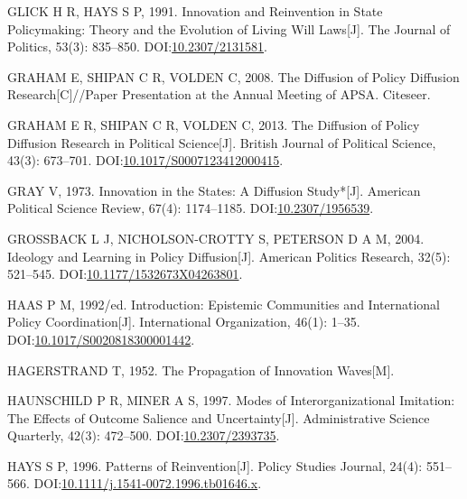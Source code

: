 \documentclass[
  12pt,
]{ctexart}
\newlength{\cslhangindent}
\newlength{\cslentryspacingunit} %
\newenvironment{CSLReferences}[2] %
 {%
  \setlength{\parindent}{0pt}
  \ifodd #1
  \let\oldpar\par
  \def\par{\hangindent=\cslhangindent\oldpar}
  \fi
  \setlength{\parskip}{#2\cslentryspacingunit}
 }%
 {}
\begin{document}
\begin{CSLReferences}{1}{0}
\leavevmode{}%
GLICK H R, HAYS S P, 1991. Innovation and {Reinvention} in {State Policymaking}: {Theory} and the {Evolution} of {Living Will Laws}{[}J{]}. The Journal of Politics, 53(3): 835--850. DOI:\href{https://doi.org/10.2307/2131581}{10.2307/2131581}.

\leavevmode{}%
GRAHAM E, SHIPAN C R, VOLDEN C, 2008. The Diffusion of Policy Diffusion Research{[}C{]}//Paper Presentation at the {Annual Meeting} of {APSA}. {Citeseer}.

\leavevmode{}%
GRAHAM E R, SHIPAN C R, VOLDEN C, 2013. The {Diffusion} of {Policy Diffusion Research} in {Political Science}{[}J{]}. British Journal of Political Science, 43(3): 673--701. DOI:\href{https://doi.org/10.1017/S0007123412000415}{10.1017/S0007123412000415}.

\leavevmode{}%
GRAY V, 1973. Innovation in the {States}: {A Diffusion Study}*{[}J{]}. American Political Science Review, 67(4): 1174--1185. DOI:\href{https://doi.org/10.2307/1956539}{10.2307/1956539}.

\leavevmode{}%
GROSSBACK L J, NICHOLSON-CROTTY S, PETERSON D A M, 2004. Ideology and {Learning} in {Policy Diffusion}{[}J{]}. American Politics Research, 32(5): 521--545. DOI:\href{https://doi.org/10.1177/1532673X04263801}{10.1177/1532673X04263801}.

\leavevmode{}%
HAAS P M, 1992/ed. Introduction: Epistemic Communities and International Policy Coordination{[}J{]}. International Organization, 46(1): 1--35. DOI:\href{https://doi.org/10.1017/S0020818300001442}{10.1017/S0020818300001442}.

\leavevmode{}%
HAGERSTRAND T, 1952. The Propagation of Innovation Waves{[}M{]}.

\leavevmode{}%
HAUNSCHILD P R, MINER A S, 1997. Modes of {Interorganizational Imitation}: {The Effects} of {Outcome Salience} and {Uncertainty}{[}J{]}. Administrative Science Quarterly, 42(3): 472--500. DOI:\href{https://doi.org/10.2307/2393735}{10.2307/2393735}.

\leavevmode{}%
HAYS S P, 1996. Patterns of {Reinvention}{[}J{]}. Policy Studies Journal, 24(4): 551--566. DOI:\href{https://doi.org/10.1111/j.1541-0072.1996.tb01646.x}{10.1111/j.1541-0072.1996.tb01646.x}.


\end{CSLReferences}
\end{document}
